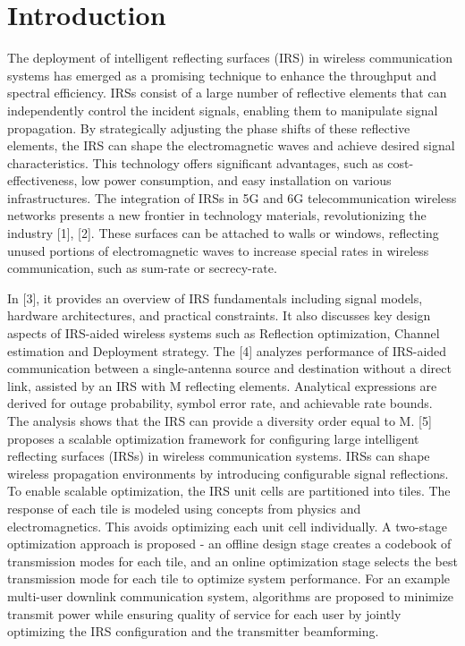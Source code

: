 \documentclass{article}
\begin{document}
\section{Introduction}
The deployment of intelligent reflecting surfaces (IRS) in wireless communication systems has emerged as a promising technique to enhance the throughput and spectral efficiency. IRSs consist of a large number of reflective elements that can independently control the incident signals, enabling them to manipulate signal propagation. By strategically adjusting the phase shifts of these reflective elements, the IRS can shape the electromagnetic waves and achieve desired signal characteristics. This technology offers significant advantages, such as cost-effectiveness, low power consumption, and easy installation on various infrastructures. The integration of IRSs in 5G and 6G telecommunication wireless networks presents a new frontier in technology materials, revolutionizing the industry [1], [2]. These surfaces can be attached to walls or windows, reflecting unused portions of electromagnetic waves to increase special rates in wireless communication, such as sum-rate or secrecy-rate.
\par In [3], it provides an overview of IRS fundamentals including signal models, hardware architectures, and practical constraints. It also discusses key design aspects of IRS-aided wireless systems such as Reflection optimization, Channel estimation and Deployment strategy.
The [4] analyzes performance of IRS-aided communication between a single-antenna source and destination without a direct link, assisted by an IRS with M reflecting elements. Analytical expressions are derived for outage probability, symbol error rate, and achievable rate bounds. The analysis shows that the IRS can provide a diversity order equal to M. [5] proposes a scalable optimization framework for configuring large intelligent reflecting surfaces (IRSs) in wireless communication systems. IRSs can shape wireless propagation environments by introducing configurable signal reflections.
To enable scalable optimization, the IRS unit cells are partitioned into tiles. The response of each tile is modeled using concepts from physics and electromagnetics. This avoids optimizing each unit cell individually. A two-stage optimization approach is proposed - an offline design stage creates a codebook of transmission modes for each tile, and an online optimization stage selects the best transmission mode for each tile to optimize system performance.
For an example multi-user downlink communication system, algorithms are proposed to minimize transmit power while ensuring quality of service for each user by jointly optimizing the IRS configuration and the transmitter beamforming.
\end{document}
